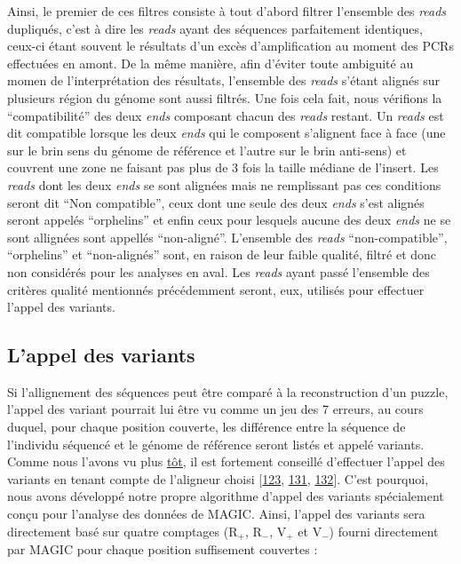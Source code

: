 \documentclass[12pt,twoside]{reedthesis}
\theoremstyle{definition}
\theoremstyle{definition}
\theoremstyle{remark}
\begin{document}
  Ainsi, le premier de ces filtres consiste à tout d'abord filtrer
  l'ensemble des \emph{reads} dupliqués, c'est à dire les \emph{reads}
  ayant des séquences parfaitement identiques, ceux-ci étant souvent le
  résultats d'un excès d'amplification au moment des PCRs effectuées en
  amont. De la même manière, afin d'éviter toute ambiguité au momen de
  l'interprétation des résultats, l'ensemble des \emph{reads} s'étant
  alignés sur plusieurs région du génome sont aussi filtrés. Une fois cela
  fait, nous vérifions la ``compatibilité'' des deux \emph{ends} composant
  chacun des \emph{reads} restant. Un \emph{reads} est dit compatible
  lorsque les deux \emph{ends} qui le composent s'alignent face à face
  (une sur le brin sens du génome de référence et l'autre sur le brin
  anti-sens) et couvrent une zone ne faisant pas plus de 3 fois la taille
  médiane de l'insert. Les \emph{reads} dont les deux \emph{ends} se sont
  alignées mais ne remplissant pas ces conditions seront dit ``Non
  compatible'', ceux dont une seule des deux \emph{ends} s'est alignés
  seront appelés ``orphelins'' et enfin ceux pour lesquels aucune des deux
  \emph{ends} ne se sont allignées sont appellés ``non-aligné''.
  L'ensemble des \emph{reads} ``non-compatible'', ``orphelins'' et
  ``non-alignés'' sont, en raison de leur faible qualité, filtré et donc
  non considérés pour les analyses en aval. Les \emph{reads} ayant passé
  l'ensemble des critères qualité mentionnés précédemment seront, eux,
  utilisés pour effectuer l'appel des variants.
  
  \newpage
  
  \subsection{L'appel des variants}\label{lappel-des-variants}
  
  Si l'allignement des séquences peut être comparé à la reconstruction
  d'un puzzle, l'appel des variant pourrait lui être vu comme un jeu des 7
  erreurs, au cours duquel, pour chaque position couverte, les différence
  entre la séquence de l'individu séquencé et le génome de référence
  seront listés et appelé variants. Comme nous l'avons vu plus
  \protect\hyperlink{varcall}{tôt}, il est fortement conseillé d'effectuer
  l'appel des variants en tenant compte de l'aligneur choisi
  {[}\protect\hyperlink{ref-Nielsen2011}{123},
  \protect\hyperlink{ref-DePristo2011}{131},
  \protect\hyperlink{ref-Lunter2011}{132}{]}. C'est pourquoi, nous avons
  développé notre propre algorithme d'appel des variants spécialement
  conçu pour l'analyse des données de MAGIC. Ainsi, l'appel des variants
  sera directement basé sur quatre comptages (R\(_+\), R\(_-\), V\(_+\) et
  V\(_-\)) fourni directement par MAGIC pour chaque position suffisement
  couvertes :
  
\end{document}
